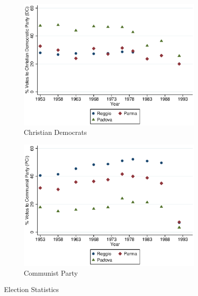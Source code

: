     \begin{figure}[H]
      \centering
        \begin{subfigure}[t]{0.49\textwidth}
          \includegraphics[width=\textwidth]{output/image/DC.eps}
\caption{Christian Democrats}
        \end{subfigure}
        \begin{subfigure}[t]{0.49\textwidth}
          \includegraphics[width=\textwidth]{output/image/PCI.eps}
 \caption{Communist Party}
        \end{subfigure}
      \caption{Election Statistics}  \label{fig:election}
    \end{figure}

